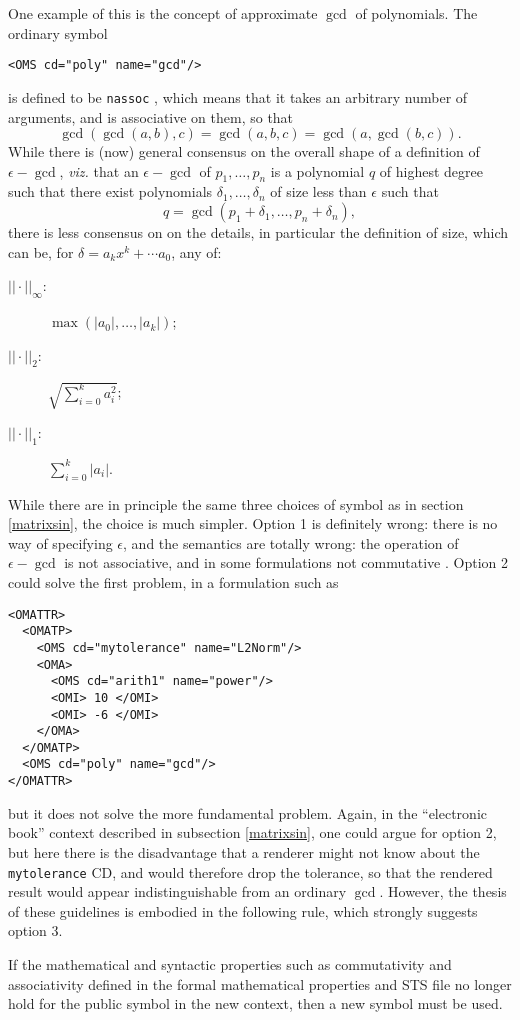 \documentclass[keylogo]{openmath}
\begin{document}
One example of this is the concept of approximate $\gcd$ of polynomials. The
ordinary symbol
\begin{verbatim}
<OMS cd="poly" name="gcd"/>
\end{verbatim}
is defined to be {\tt nassoc} \cite{STS}, which means that it takes an
arbitrary number of arguments, and is associative on them, so that
\begin{equation}\label{gcdassoc}
\gcd(\gcd(a,b),c)=\gcd(a,b,c)=\gcd(a,\gcd(b,c)).
\end{equation}
While there is (now) general consensus on the overall shape of a definition
of $\epsilon-\gcd$, {\it viz.\/} that an $\epsilon-\gcd$ of $p_1,\ldots,p_n$
is a polynomial $q$ of highest degree such that there exist polynomials
$\delta_1,\ldots,\delta_n$ of size less than $\epsilon$ such that
$$
q=\gcd(p_1+\delta_1,\ldots,p_n+\delta_n),
$$
there is less consensus on on the details, in particular the definition of
size, which can be, for $\delta=a_kx^k+\cdots a_0$, any of:
\begin{description}
\item[$||\cdot||_\infty$:]$\max(|a_0|,\ldots,|a_k|)$;
\item[$||\cdot||_2$:]$\sqrt{\sum_{i=0}^k a_i^2}$;
\item[$||\cdot||_1$:]$\sum_{i=0}^k|a_i|$.
\end{description}
While there are in principle the same three choices of symbol as in section
\ref{matrixsin}, the choice is much simpler. Option 1 is definitely wrong:
there is no way of specifying $\epsilon$, and the semantics are totally
wrong: the operation of $\epsilon-\gcd$ is not associative, and in some
formulations not commutative \cite{Rupprecht}. Option 2 could solve the
first problem, in a formulation such as 
\begin{verbatim}
<OMATTR>
  <OMATP>
    <OMS cd="mytolerance" name="L2Norm"/>
    <OMA>
      <OMS cd="arith1" name="power"/>
      <OMI> 10 </OMI>
      <OMI> -6 </OMI>
    </OMA>
  </OMATP>
  <OMS cd="poly" name="gcd"/>
</OMATTR>
\end{verbatim}
but it does not solve the more fundamental problem. Again, in the
``electronic book'' context described in subsection \ref{matrixsin},  one
could argue for option 2, but here there is the disadvantage that a
renderer might not know about the {\tt mytolerance} CD, and would therefore
drop the tolerance, so that the rendered result would appear
indistinguishable from an ordinary $\gcd$. However, the thesis of these
guidelines is embodied in the following rule, which strongly suggests
option 3.
\begin{rule}
If the mathematical and syntactic properties such as commutativity and
associativity defined in the formal mathematical properties and STS file no
longer hold for the public symbol in the new context, then a new symbol
must be used.
\end{rule}
\end{document}
